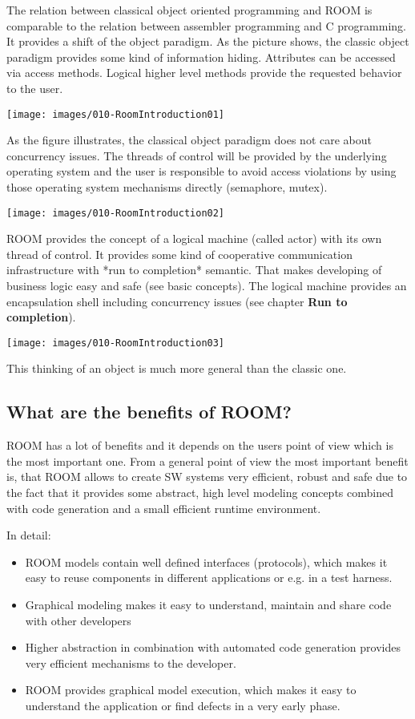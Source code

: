 The relation between classical object oriented programming and ROOM is comparable to the relation between assembler programming and C programming. It provides a shift of the object paradigm. As the picture shows, the classic object paradigm provides some kind of information hiding. Attributes can be accessed via access methods. Logical higher level methods provide the requested behavior to the user.   

\texttt{[image: images/010-RoomIntroduction01]}

As the figure illustrates, the classical object paradigm does not care about concurrency issues. The threads of control will be provided by the underlying operating system and the user is responsible to avoid access violations by using those operating system mechanisms directly (semaphore, mutex).

\texttt{[image: images/010-RoomIntroduction02]}

ROOM provides the concept of a logical machine (called actor) with its own thread of control. It provides some kind of cooperative communication infrastructure with *run to completion* semantic. That makes developing of business logic easy and safe (see basic concepts). The logical machine provides an encapsulation shell including concurrency issues (see chapter \textbf{Run to completion}). 

\texttt{[image: images/010-RoomIntroduction03]}

This thinking of an object is much more general than the classic one.  

\subsection{What are the benefits of ROOM?}

ROOM has a lot of benefits and it depends on the users point of view which is the most important one. From a general point of view the most important benefit is, that ROOM allows to create SW systems very efficient, robust and safe due to the fact that it provides some abstract, high level modeling concepts combined with code generation and a small efficient runtime environment.  

In detail:
\begin{itemize}
\item ROOM models contain well defined interfaces (protocols), which makes it easy to reuse components in different applications or e.g. in a test harness. 
\item Graphical modeling makes it easy to understand, maintain and share code with other developers
\item Higher abstraction in combination with automated code generation provides very efficient mechanisms to the developer. 
\item ROOM provides graphical model execution, which makes it easy to understand the application or find defects in a very early phase. 
\end{itemize}

